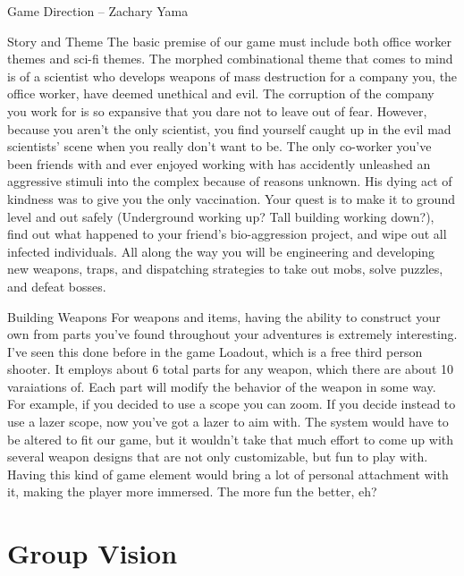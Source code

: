 \documentclass[12pt]{report}
\begin{document}
\begin{section}{Game Direction – Zachary Yama}
\begin{subsection}{Story and Theme}
The basic premise of our game must include both office worker themes and sci-fi themes. 
The morphed combinational theme that comes to mind is of a scientist who develops weapons 
of mass destruction for a company you, the office worker, have deemed unethical and evil. 
The corruption of the company you work for is so expansive that you dare not to leave out 
of fear. However, because you aren’t the only scientist, you find yourself caught up in the 
evil mad scientists’ scene when you really don’t want to be. The only co-worker you’ve been 
friends with and ever enjoyed working with has accidently unleashed an aggressive stimuli 
into the complex because of reasons unknown. His dying act of kindness was to give you the 
only vaccination. Your quest is to make it to ground level and out safely (Underground 
working up? Tall building working down?), find out what happened to your friend’s 
bio-aggression project, and wipe out all infected individuals. All along the way you will 
be engineering and developing new weapons, traps, and dispatching strategies to take out 
mobs, solve puzzles, and defeat bosses.

\end{subsection}
\begin{subsection}{Building Weapons}
For weapons and items, having the ability to construct your own from parts you've found 
throughout your adventures is extremely interesting. I've seen this done before in the
game Loadout, which is a free third person shooter. It employs about 6 total parts for
any weapon, which there are about 10 varaiations of. Each part will modify the behavior
of the weapon in some way. For example, if you decided to use a scope you can zoom. If
you decide instead to use a lazer scope, now you've got a lazer to aim with. The system
would have to be altered to fit our game, but it wouldn't take that much effort to come
up with several weapon designs that are not only customizable, but fun to play with. 
Having this kind of game element would bring a lot of personal attachment with it, making
the player more immersed. The more fun the better, eh?

\end{subsection}
\end{section}


\chapter{Group Vision}
\end{document}
